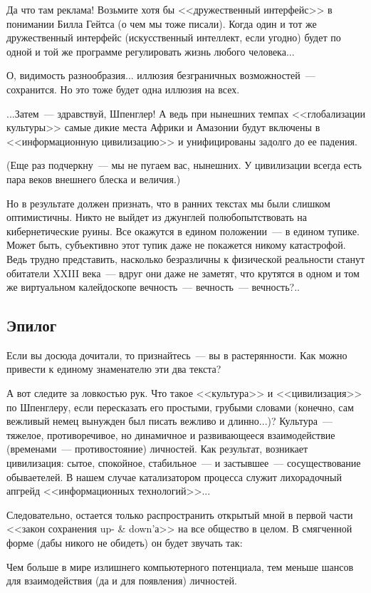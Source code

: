 \documentclass{scrbook}
\newcommand{\flqq}{<<}
\newcommand{\frqq}{>>}
\newcommand{\mdash}{~--- }
\newcommand{\essaysection}[1]{\subsection*{#1}\nopagebreak}
\begin{document}
Да что там реклама! Возьмите хотя бы {\flqq}дружественный интерфейс{\frqq} в понимании Билла Гейтса (о чем мы тоже писали). Когда один и тот же дружественный интерфейс (искусственный интеллект, если угодно) будет по одной и той же программе регулировать жизнь любого человека...

О, видимость разнообразия... иллюзия безграничных возможностей{\mdash}сохранится. Но это тоже будет одна иллюзия на всех.

...Затем{\mdash}здравствуй, Шпенглер! А ведь при нынешних темпах {\flqq}глобализации культуры{\frqq} самые дикие места Африки и Амазонии будут включены в {\flqq}информационную цивилизацию{\frqq} и унифицированы задолго до ее падения.

(Еще раз подчеркну{\mdash}мы не пугаем вас, нынешних. У цивилизации всегда есть пара веков внешнего блеска и величия.)

Но в результате должен признать, что в ранних текстах мы были слишком оптимистичны. Никто не выйдет из джунглей полюбопытствовать на кибернетические руины. Все окажутся в едином положении{\mdash}в едином тупике. Может быть, субъективно этот тупик даже не покажется никому катастрофой. Ведь трудно представить, насколько безразличны к физической реальности станут обитатели XXIII века{\mdash}вдруг они даже не заметят, что крутятся в одном и том же виртуальном калейдоскопе вечность{\mdash}вечность{\mdash}вечность?..

\essaysection{Эпилог}

Если вы досюда дочитали, то признайтесь{\mdash}вы в растерянности. Как можно привести к единому знаменателю эти два текста?

А вот следите за ловкостью рук. Что такое {\flqq}культура{\frqq} и {\flqq}цивилизация{\frqq} по Шпенглеру, если пересказать его простыми, грубыми словами (конечно, сам вежливый немец вынужден был писать вежливо и длинно...)? Культура{\mdash}тяжелое, противоречивое, но динамичное и развивающееся взаимодействие (временами{\mdash}противостояние) личностей. Как результат, возникает цивилизация: сытое, спокойное, стабильное{\mdash}и застывшее{\mdash}сосуществование обываетелей. В нашем случае катализатором процесса служит лихорадочный апгрейд {\flqq}информационных технологий{\frqq}...

Следовательно, остается только распространить открытый мной в первой части {\flqq}закон сохранения up- \& down'а{\frqq} на все общество в целом. В смягченной форме (дабы никого не обидеть) он будет звучать так:

Чем больше в мире излишнего компьютерного потенциала, тем меньше шансов для взаимодействия (да и для появления) личностей.
\end{document}
